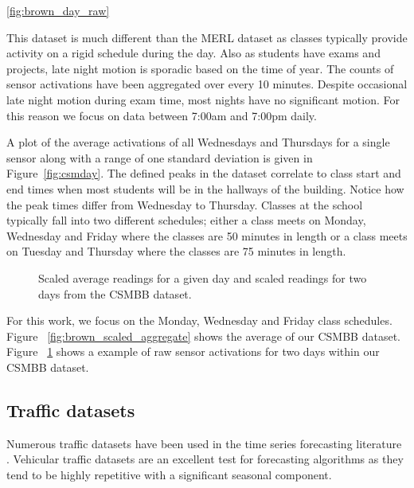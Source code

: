 \ref{fig:brown_day_raw}

This dataset is much different than the MERL dataset as classes typically provide activity on a rigid schedule during the day.  Also as students have exams and projects, late night motion is sporadic based on the time of year.  The counts of sensor activations have been aggregated over every 10 minutes.  Despite occasional late night motion during exam time, most nights have no significant motion.  For this reason we focus on data between 7:00am and 7:00pm daily.  

A plot of the average activations of all Wednesdays and Thursdays for a single sensor along with a range of one standard deviation is given in Figure~\ref{fig:csmday}.  The defined peaks in the dataset correlate to class start and end times when most students will be in the hallways of the building.  Notice how the peak times differ from Wednesday to Thursday.  Classes at the school typically fall into two different schedules; either a class meets on Monday, Wednesday and Friday where the classes are 50 minutes in length or a class meets on Tuesday and Thursday where the classes are 75 minutes in length. 

\begin{figure}[!ht]
	\begin{center}
		\label{fig:brown_scaled_aggregate}
		\label{fig:brown_scaled_raw}
	\end{center}
	\caption{Scaled average readings for a given day and scaled readings for two days from the CSMBB dataset.}
\end{figure}

For this work, we focus on the Monday, Wednesday and Friday class schedules.  Figure ~\ref{fig:brown_scaled_aggregate} shows the average of our CSMBB dataset.  Figure ~\ref{fig:brown_scaled_raw} shows a example of raw sensor activations for two days within our CSMBB dataset.


\subsection{Traffic datasets}
Numerous traffic datasets have been used in the time series forecasting literature \cite{Kamarianakis2003, Smith2002, Williams2003, Zhang2009}.  Vehicular traffic datasets are an excellent test for forecasting algorithms as they tend to be highly repetitive with a significant seasonal component.  

